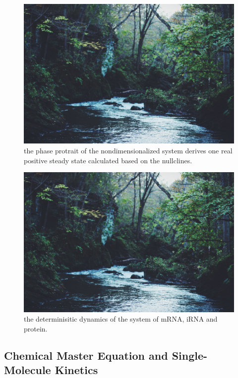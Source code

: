 \documentclass[fleqn,10pt]{wlscirep}
\begin{document}

\begin{figure}[ht]
\centering
\includegraphics[width=\linewidth]{deterss}
\caption{the phase protrait of the nondimensionalized system derives one real positive steady state calculated based on the nullclines.}
\label{fig:deterss}
\end{figure}


\begin{figure}[ht]
\centering
\includegraphics[width=\linewidth]{deterdyn}
\caption{the determinisitic dynamics of the system of mRNA, iRNA and protein.}
\label{fig:deterdyn}
\end{figure}

\subsection*{Chemical Master Equation and Single-Molecule Kinetics}
\end{document}
